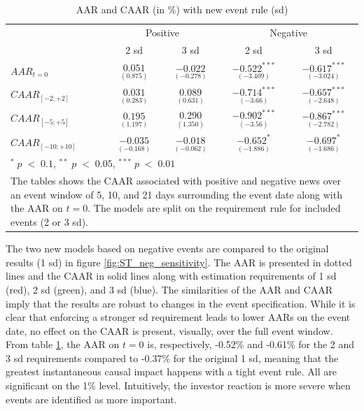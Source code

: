 \begin{table}[ht]
\centering
\caption{AAR and CAAR (in \%) with new event rule (sd)} 
\begin{tabular}{lcccc}
  \hline  \hline
  & \multicolumn{2}{c}{Positive} &  \multicolumn{2}{c}{Negative}\\ \cline{2-3} \cline{4-5}  
  & 2 sd & 3 sd & 2 sd & 3 sd   \\   
 \hline
$AAR_{t=0}$ & $\underset{(0.875)}{0.051}$ & $\underset{(-0.278)}{-0.022}$  & $\underset{(-3.409)}{-0.522^{***}}$ & $\underset{(-3.024)}{-0.617^{***}}$ \\ 
$CAAR_{[-2;+2]}$  & $\underset{(0.283)}{0.031}$  & $\underset{(0.631)}{0.089}$  & $\underset{(-3.66)}{-0.714^{***}}$ & $\underset{(-2.648)}{-0.657^{***}}$ \\ 
$CAAR_{[-5;+5]}$  & $\underset{(1.197)}{0.195}$  & $\underset{(1.350)}{0.290}$  &$\underset{(-3.56)}{-0.902^{***}}$ & $\underset{(-2.782)}{-0.867^{***}}$ \\ 
$CAAR_{[-10;+10]}$  & $\underset{(-0.168)}{-0.035}$  & $\underset{(-0.062)}{-0.018}$  & $\underset{(-1.886)}{-0.652^{*}}$ & $\underset{(-1.686)}{-0.697^{*}}$ \\ 
   \hline \hline
   \multicolumn{5}{p{12cm}}{ \footnotesize $^* \; p\; <\; 0.1$, $ ^{**} \; p\; <\; 0.05$, $ ^{***} \; p\; <\; 0.01$  } \\
   \multicolumn{5}{p{13cm}}{\footnotesize The tables shows the CAAR associated with positive and negative news over an event window of 5, 10, and 21 days surrounding the event date along with the AAR on $t=0$. The models are split on the requirement rule for included events (2 or 3 sd).} \\
   \hline
\end{tabular}
\label{tab:ST_sensitivity}
\end{table}

The two new models based on negative events are compared to the original results (1 sd) in figure \ref{fig:ST_neg_sensitivity}. The AAR is presented in dotted lines and the CAAR in solid lines along with estimation requirements of 1 sd (red), 2 sd (green), and 3 sd (blue). The similarities of the AAR and CAAR imply that the results are robust to changes in the event specification. While it is clear that enforcing a stronger sd requirement leads to lower AARs on the event date, no effect on the CAAR is present, visually, over the full event window. From table \ref{tab:ST_sensitivity}, the AAR on $t=0$ is, respectively, -0.52\% and -0.61\% for the 2 and 3 sd requirements compared to -0.37\% for the original 1 sd, meaning that the greatest instantaneous causal impact happens with a tight event rule. All are significant on the 1\% level. Intuitively, the investor reaction is more severe when events are identified as more important.  


